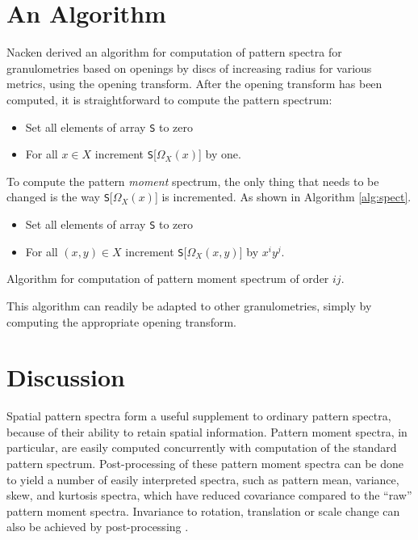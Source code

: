 \documentclass[b1]{sciposter}
\begin{document}
\begin{multicols}{2}
\section{An Algorithm}

Nacken \cite{Nacken:thesis} derived an algorithm for computation
of pattern spectra for granulometries based on openings by discs of increasing
radius for various metrics, using the opening transform. After the
opening transform has been computed, it is straightforward to compute the 
pattern spectrum:
\begin{itemize}
\item Set all elements of array {\tt S} to zero
\item For all $x \in X$ increment {\tt S}[$\Omega_X(x)$] by one. 
\end{itemize}

To compute the pattern \emph{moment} spectrum, the only thing that needs to be
changed is the way {\tt S}[$\Omega_X(x)$] is incremented. As shown in Algorithm
\ref{alg:spect}.

\begin{algorithm}
\begin{itemize}
\item Set all elements of array {\tt S} to zero
\item For all $(x,y) \in X$ increment {\tt S}[$\Omega_X(x,y)$] by 
$x^iy^j$. 
\end{itemize}
\caption{ Algorithm for computation of pattern moment
spectrum of order $ij$. \label{alg:spect}}
\end{algorithm}

This algorithm can 
readily be adapted to other granulometries, simply by computing the 
appropriate opening transform.

 



\section{Discussion}
Spatial pattern spectra form a useful supplement to ordinary pattern 
spectra, because of their ability to retain spatial information.  
Pattern moment spectra, in particular, are easily computed concurrently with 
computation of the standard pattern spectrum. Post-processing of these pattern
moment spectra can be done to yield a number of easily interpreted spectra, 
such as pattern mean, variance, skew, and kurtosis spectra, which have reduced 
covariance compared to the ``raw'' pattern moment spectra. Invariance to 
rotation, translation or scale change can also be achieved by post-processing
\cite{Flusser:Suk:93,Hu:62}.


\end{multicols}
\end{document}
